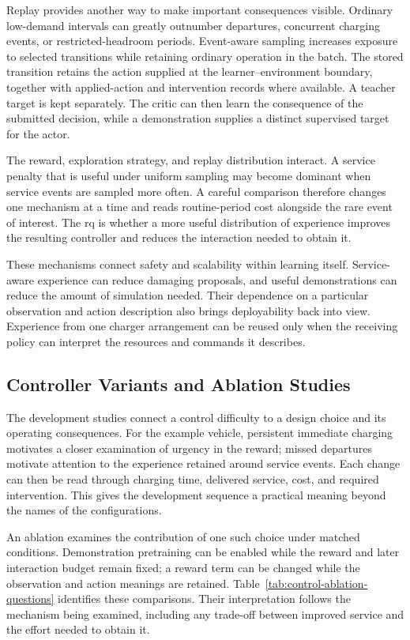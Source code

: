 Replay provides another way to make important consequences visible. Ordinary low-demand intervals can greatly outnumber departures, concurrent charging events, or restricted-headroom periods. Event-aware sampling increases exposure to selected transitions while retaining ordinary operation in the batch. The stored transition retains the action supplied at the learner--environment boundary, together with applied-action and intervention records where available. A teacher target is kept separately. The critic can then learn the consequence of the submitted decision, while a demonstration supplies a distinct supervised target for the actor.

The reward, exploration strategy, and replay distribution interact. A service penalty that is useful under uniform sampling may become dominant when service events are sampled more often. A careful comparison therefore changes one mechanism at a time and reads routine-period cost alongside the rare event of interest. The \gls{rq} is whether a more useful distribution of experience improves the resulting controller and reduces the interaction needed to obtain it.

These mechanisms connect safety and scalability within learning itself. Service-aware experience can reduce damaging proposals, and useful demonstrations can reduce the amount of simulation needed. Their dependence on a particular observation and action description also brings deployability back into view. Experience from one charger arrangement can be reused only when the receiving policy can interpret the resources and commands it describes.

\subsection{Controller Variants and Ablation Studies}
\label{sec:control-ablations}

The development studies connect a control difficulty to a design choice and its operating consequences. For the example vehicle, persistent immediate charging motivates a closer examination of urgency in the reward; missed departures motivate attention to the experience retained around service events. Each change can then be read through charging time, delivered service, cost, and required intervention. This gives the development sequence a practical meaning beyond the names of the configurations.

An ablation examines the contribution of one such choice under matched conditions. Demonstration pretraining can be enabled while the reward and later interaction budget remain fixed; a reward term can be changed while the observation and action meanings are retained. Table~\ref{tab:control-ablation-questions} identifies these comparisons. Their interpretation follows the mechanism being examined, including any trade-off between improved service and the effort needed to obtain it.

